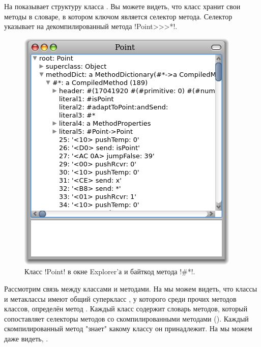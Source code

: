 \documentclass[a4paper,10pt,twoside]{book}
\begin{document}
На   показывает структуру класса .
Вы можете видеть, что класс хранит свои методы в словаре, в котором ключом является селектор метода.
Селектор \ct{#*} указывает на декомпилированный  метода \ct!Point>>>*!.

\begin{figure}[ht]\centering
	\includegraphics[width=.5\linewidth]{CompiledMethod}
	\caption{Класс \ct!Point! в окне Explorer'а и байткод метода \ct!\#*!.}
\end{figure}

Рассмотрим связь между классами и методами.
На  мы можем видеть, что классы и метаклассы имеют общий суперкласс , у которого среди прочих методов классов, определён метод .
Каждый класс содержит словарь методов, который сопоставляет селекторы методов со скомпилированными методами ().
Каждый скомпилированный метод "знает" какому классу он принадлежит.
На  мы можем даже видеть, .
\end{document}
